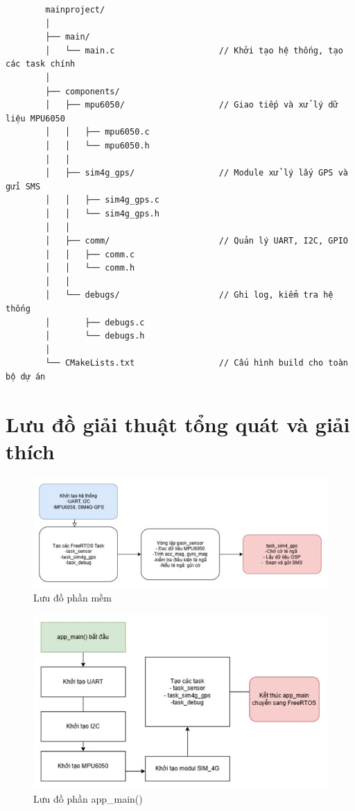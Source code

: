\documentclass[a4paper,12pt]{report}
\begin{document}
	\newpage
	\begin{verbatim}
		mainproject/
		│
		├── main/
		│   └── main.c                     // Khởi tạo hệ thống, tạo các task chính
		│
		├── components/
		│   ├── mpu6050/                   // Giao tiếp và xử lý dữ liệu MPU6050
		│   │   ├── mpu6050.c
		│   │   └── mpu6050.h
		│   │
		│   ├── sim4g_gps/                 // Module xử lý lấy GPS và gửi SMS
		│   │   ├── sim4g_gps.c
		│   │   └── sim4g_gps.h
		│   │
		│   ├── comm/                      // Quản lý UART, I2C, GPIO
		│   │   ├── comm.c
		│   │   └── comm.h
		│   │
		│   └── debugs/                    // Ghi log, kiểm tra hệ thống
		│       ├── debugs.c
		│       └── debugs.h
		│
		└── CMakeLists.txt                 // Cấu hình build cho toàn bộ dự án
	\end{verbatim}
	
	
	
	\section{Lưu đồ giải thuật tổng quát và giải thích}
	
	\begin{figure}[h]
		\centering
		\includegraphics[width=\textwidth]{luu_do_phan_mem.png}
		\caption{Lưu đồ phần mềm}
		\label{fig:software_flowchart}
	\end{figure}
	
	\begin{figure}[h]
		\centering
		\includegraphics[width=\textwidth]{luu_do_phan_app_main.png}
		\caption{Lưu đồ phần app\_main()}
		\label{fig:app_main_flowchart}
	\end{figure}
	
\end{document}
